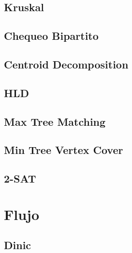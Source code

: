 \documentclass[a4paper,11pt,landscape,twocolumn]{article}
\begin{document}
\subsection{Kruskal}



\subsection{Chequeo Bipartito}



\subsection{Centroid Decomposition}



\subsection{HLD}



\subsection{Max Tree Matching}



\subsection{Min Tree Vertex Cover}



\subsection{2-SAT}



\section{Flujo}

\subsection{Dinic}
\end{document}
